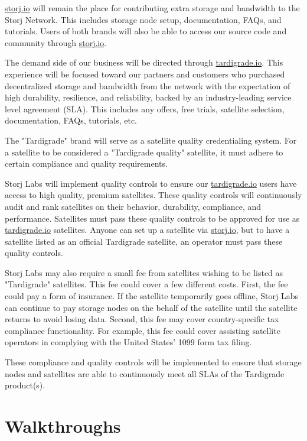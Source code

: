 \documentclass[11pt,fleqn,openany]{book}
\begin{document}
\url{storj.io} will remain the place for contributing extra storage and
bandwidth to the Storj Network. This includes storage node setup, documentation,
FAQs, and tutorials. Users of both brands will also be able to access our
source code and community through \url{storj.io}.

The demand side of our business will be directed through \url{tardigrade.io}.
This experience will be focused toward our partners and customers who purchased
decentralized storage and bandwidth from the network with the expectation of
high durability, resilience, and reliability, backed by an industry-leading
service level agreement (SLA). This includes any offers, free trials, satellite
selection, documentation, FAQs, tutorials, etc.

The "Tardigrade" brand will serve as a satellite quality credentialing system.
For a satellite to be considered a "Tardigrade quality" satellite, it must
adhere to certain compliance and quality requirements.

Storj Labs will implement quality controls to ensure our
\url{tardigrade.io} users have access to high quality, premium satellites.
These quality controls will continuously audit and rank satellites on their
behavior, durability, compliance, and performance.
Satellites must pass these quality controls to be approved for use as
\url{tardigrade.io} satellites. Anyone can set up a satellite via
\url{storj.io}, but to have a satellite listed as an official Tardigrade
satellite, an operator must pass these quality controls.

Storj Labs may also require a small fee from satellites wishing to be listed
as "Tardigrade" satellites. This fee could cover a few different costs. First,
the fee could pay a form of insurance. If the satellite temporarily goes
offline, Storj Labs can continue to pay storage nodes on the behalf of the
satellite until the satellite returns to avoid losing data. Second, this fee
may cover country-specific tax compliance functionality. For example, this fee
could cover assisting satellite operators in complying with the United States'
1099 form tax filing.

These compliance and quality controls will be implemented to ensure that
storage nodes and satellites are able to continuously meet all SLAs of the
Tardigrade product(s).

\chapter{Walkthroughs}\label{chap:walkthroughs}
\end{document}
